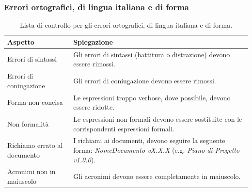\documentclass[8pt]{article}
\begin{document}
\subsubsection{Errori ortografici, di lingua italiana e di forma}
\renewcommand{\arraystretch}{2.5}
\begin{longtable}{|>{\centering}p{5cm}|>{\centering\arraybackslash}p{10cm}|}
\hline
\rowcolor{white}
    \textbf{Aspetto} & \textbf{Spiegazione} \\
\hline
\endfirsthead
\rowcolor{white}
\caption{Lista di controllo per gli errori ortografici, di lingua italiana e di forma.}
\label{table:Lista di controllo per gli errori ortografici, di lingua italiana e di forma}
\endlastfoot
    Errori di sintassi & Gli errori di sintassi (battitura o distrazione) devono essere rimossi.\\
\hline
    Errori di coniugazione & Gli errori di coniugazione devono essere rimossi. \\
\hline
    Forma non concisa & Le espressioni troppo verbose, dove possibile, devono essere ridotte.\\
\hline
    Non formalità & Le espressioni non formali devono essere sostituite con le corrispondenti
    espressioni formali. \\
\hline
    Richiamo errato al documento & I richiami ai documenti, devono seguire la seguente forma:
    \textit{NomeDocumento vX.X.X} (e.g. \textit{Piano di Progetto v1.0.0}).\\
\hline
    Acronimi non in maiuscolo & Gli acronimi devono essere completamente in maiuscolo. \\
\hline
\end{longtable}
\end{document}
